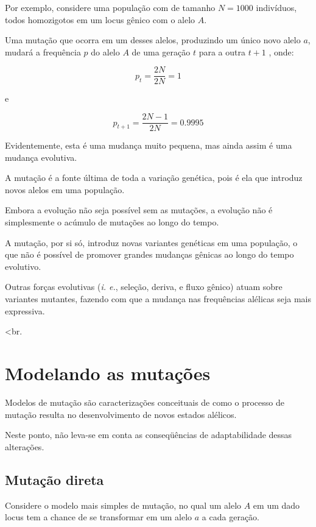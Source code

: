 \documentclass[
]{book}
\begin{document}
Por exemplo, considere uma população com de tamanho \(N = 1000\) indivíduos, todos homozigotos em um locus gênico com o alelo \(A\).

Uma mutação que ocorra em um desses alelos, produzindo um único novo alelo \(a\), mudará a frequência \(p\) do alelo \(A\) de uma geração \(t\) para a outra \(t+1\) , onde:

\[p_t = \frac{2N}{2N} = 1 \]

e

\[ p_{t+1} = \frac{2N-1}{2N} = 0.9995\]

Evidentemente, esta é uma mudança muito pequena, mas ainda assim é uma mudança evolutiva.

A mutação é a fonte última de toda a variação genética, pois é ela que introduz novos alelos em uma população.

Embora a evolução não seja possível sem as mutações, a evolução não é simplesmente o acúmulo de mutações ao longo do tempo.

A mutação, por si só, introduz novas variantes genéticas em uma população, o que não é possível de promover grandes mudanças gênicas ao longo do tempo evolutivo.

Outras forças evolutivas (\emph{i. e.}, seleção, deriva, e fluxo gênico) atuam sobre variantes mutantes, fazendo com que a mudança nas frequências alélicas seja mais expressiva.

\textless br.

\hypertarget{modelando-as-mutauxe7uxf5es}{%
\section{Modelando as mutações}\label{modelando-as-mutauxe7uxf5es}}

Modelos de mutação são caracterizações conceituais de como o processo de mutação resulta no desenvolvimento de novos estados alélicos.

Neste ponto, não leva-se em conta as conseqüências de adaptabilidade dessas alterações.

\hypertarget{mutauxe7uxe3o-direta}{%
\subsection{Mutação direta}\label{mutauxe7uxe3o-direta}}

Considere o modelo mais simples de mutação, no qual um alelo \(A\) em um dado locus tem a chance de se transformar em um alelo \(a\) a cada geração.
\end{document}
